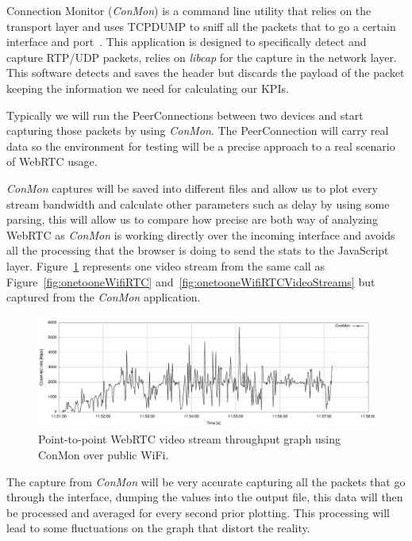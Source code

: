 Connection Monitor ({\it ConMon}) is a command line utility that relies on the transport layer and uses TCPDUMP to sniff all the packets that to go a certain interface and port~\cite{singhConMon}. This application is designed to specifically detect and capture RTP/UDP packets, relies on {\it libcap} for the capture in the network layer. This software detects and saves the header but discards the payload of the packet keeping the information we need for calculating our KPIs.

Typically we will run the PeerConnections between two devices and start capturing those packets by using {\it ConMon}. The PeerConnection will carry real data so the environment for testing will be a precise approach to a real scenario of WebRTC usage.

{\it ConMon} captures will be saved into different files and allow us to plot every stream bandwidth and calculate other parameters such as delay by using some parsing, this will allow us to compare how precise are both way of analyzing WebRTC as {\it ConMon} is working directly over the incoming interface and avoids all the processing that the browser is doing to send the stats to the JavaScript layer. Figure~\ref{fig:onetooneWifiRTCConMon} represents one video stream from the same call as Figure~\ref{fig:onetooneWifiRTC} and~\ref{fig:onetooneWifiRTCVideoStreams} but captured from the {\it ConMon} application.

 \begin{figure}[h]
  \centering
    \includegraphics[width=1\textwidth]{./figures/onetooneWiFiConMon.pdf}
      \caption[Point-to-point WebRTC video stream throughput graph using ConMon over public WiFi]{Point-to-point WebRTC video stream throughput graph using ConMon over public WiFi.}
	\label{fig:onetooneWifiRTCConMon}
\end{figure}

The capture from {\it ConMon} will be very accurate capturing all the packets that go through the interface, dumping the values into the output file, this data will then be processed and averaged for every second prior plotting. This processing will lead to some fluctuations on the graph that distort the reality.

